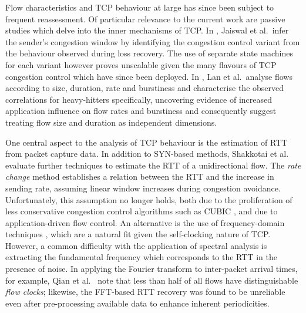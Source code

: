 Flow characteristics and \ac{TCP} behaviour at large has since been subject to frequent reassessment.
Of particular relevance to the current work are passive studies which delve into the inner mechanisms of \ac{TCP}.
In \cite{Jaiswal:2004p242}, Jaiswal et al.\ infer the sender's congestion window by identifying the congestion control variant from the behaviour observed during loss recovery.
The use of separate state machines for each variant however proves unscalable given the many flavours of \ac{TCP} congestion control which have since been deployed.
In \cite{Lan:2006p566}, Lan et al.\ analyse flows according to size, duration, rate and burstiness and characterise the observed correlations for heavy-hitters specifically,
uncovering evidence of increased application influence on flow rates and burstiness and consequently suggest treating flow size and duration as independent dimensions.

One central aspect to the analysis of \ac{TCP} behaviour is the estimation of \ac{RTT} from packet capture data. 
In addition to SYN-based methods, Shakkotai et al.\ \cite{Shakkottai:2004p408} evaluate further techniques to estimate the \ac{RTT} of a unidirectional flow. 
The \textit{rate change} method establishes a relation between the \ac{RTT} and the increase in sending rate, assuming linear window increases during congestion avoidance. 
Unfortunately, this assumption no longer holds, both due to the proliferation of less conservative congestion control algorithms such as CUBIC \cite{Ha:2008p471}, and due to application-driven flow control. 
An alternative is the use of frequency-domain techniques \cite{Veal:2005p412,Lance:2005p565,Qian:2009p429}, which are a natural fit given the self-clocking nature of \ac{TCP}. 
However, a common difficulty with the application of spectral analysis is extracting the fundamental frequency which corresponds to the \ac{RTT} in the presence of noise. 
In applying the Fourier transform to inter-packet arrival times, for example, Qian et al.\ \cite{Qian:2009p429} note that less than half of all flows have distinguishable \textit{flow clocks}; likewise, the \ac{FFT}-based \ac{RTT} recovery was found to be unreliable even after pre-processing available data to enhance inherent periodicities.

